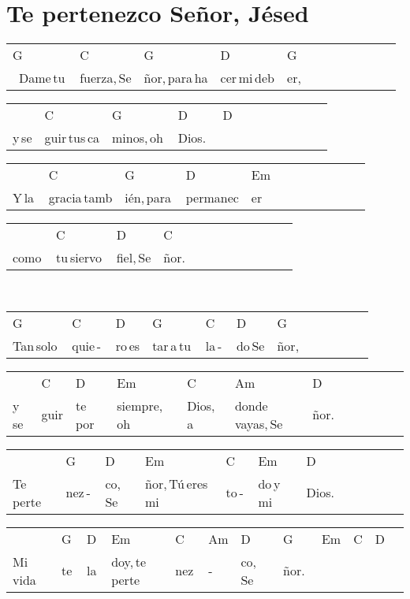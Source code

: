 \section*{Te pertenezco Señor, Jésed\hfill}
\begin{multicols}{2}
\noindent
\begin{minipage}{\columnwidth}
\noindent
\noindent
\begin{tabular}{llllllllllll}
G&C&G&D&G\\
\,\,\,Dame\,tu\,&fuerza,\,Se&ñor,\,para\,ha&cer\,mi\,deb&er,
\end{tabular}

\noindent
\begin{tabular}{llllllllllll}
&C&G&D&D\\
y\,se&guir\,tus\,ca&minos,\,oh\,&Dios.\,\,&
\end{tabular}

\noindent
\begin{tabular}{llllllllllll}
&C&G&D&Em\\
Y\,la\,&gracia\,tamb&ién,\,para\,&permanec&er
\end{tabular}

\noindent
\begin{tabular}{llllllllllll}
&C&D&C\\
como\,&tu\,siervo\,&fiel,\,Se&ñor.
\end{tabular}
\end{minipage}\\

\noindent
\begin{minipage}{\columnwidth}
\noindent
\noindent
\begin{tabular}{llllllllllll}
G&C&D&G&C&D&G\\
Tan\,solo\,&quie\,-\,&ro\,es&tar\,a\,tu\,&la\,-\,&do\,Se&ñor,
\end{tabular}

\noindent
\begin{tabular}{llllllllllll}
&C&D&Em&C&Am&D\\
y\,se&guir&te\,por\,&siempre,\,oh\,&Dios,\,a\,&donde\,vayas,\,Se&ñor.
\end{tabular}

\noindent
\begin{tabular}{llllllllllll}
&G&D&Em&C&Em&D\\
Te\,perte&nez\,-\,&co,\,Se&ñor,\,Tú\,eres\,mi\,&to\,-\,&do\,y\,mi\,&Dios.
\end{tabular}

\noindent
\begin{tabular}{llllllllllll}
&G&D&Em&C&Am&D&G&Em&C&D\\
Mi\,vida\,&te\,&la\,&doy,\,te\,perte&nez\,&-\,&co,\,\,\,Se&ñor.\,\,&\qquad\,&\quad\,\,&
\end{tabular}
\end{minipage}\\


\end{multicols}
